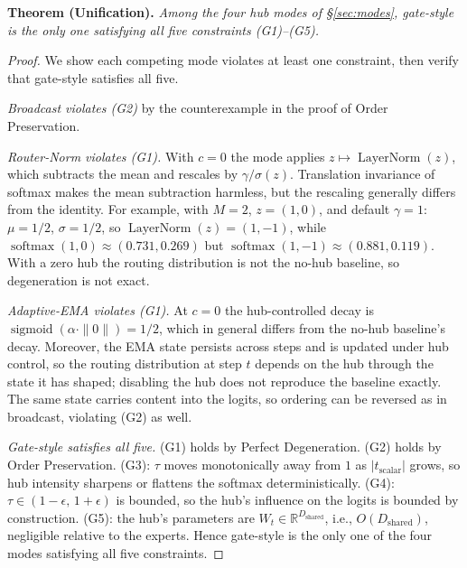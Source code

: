 \documentclass[10pt,twoside]{article}
\newcommand{\softmax}{\operatorname{softmax}}
\newcommand{\sigmoid}{\operatorname{sigmoid}}
\theoremstyle{definition}
\begin{document}
\medskip
\noindent\textbf{Theorem (Unification).} \emph{Among the four hub modes of \S\ref{sec:modes}, gate-style is the only one satisfying all five constraints (G1)--(G5).}

\begin{proof}
We show each competing mode violates at least one constraint, then verify that gate-style satisfies all five.

\emph{Broadcast violates (G2)} by the counterexample in the proof of Order Preservation.

\emph{Router-Norm violates (G1).} With $c = 0$ the mode applies $z \mapsto \operatorname{LayerNorm}(z)$, which subtracts the mean and rescales by $\gamma / \sigma(z)$. Translation invariance of softmax makes the mean subtraction harmless, but the rescaling generally differs from the identity. For example, with $M = 2$, $z = (1, 0)$, and default $\gamma = 1$: $\mu = 1/2$, $\sigma = 1/2$, so $\operatorname{LayerNorm}(z) = (1, -1)$, while $\softmax(1, 0) \approx (0.731, 0.269)$ but $\softmax(1, -1) \approx (0.881, 0.119)$. With a zero hub the routing distribution is not the no-hub baseline, so degeneration is not exact.

\emph{Adaptive-EMA violates (G1).} At $c = 0$ the hub-controlled decay is $\sigmoid(\alpha \cdot \|0\|) = 1/2$, which in general differs from the no-hub baseline's decay. Moreover, the EMA state persists across steps and is updated under hub control, so the routing distribution at step $t$ depends on the hub through the state it has shaped; disabling the hub does not reproduce the baseline exactly. The same state carries content into the logits, so ordering can be reversed as in broadcast, violating (G2) as well.

\emph{Gate-style satisfies all five.} (G1) holds by Perfect Degeneration. (G2) holds by Order Preservation. (G3): $\tau$ moves monotonically away from $1$ as $|t_{\text{scalar}}|$ grows, so hub intensity sharpens or flattens the softmax deterministically. (G4): $\tau \in (1 - \epsilon,\, 1 + \epsilon)$ is bounded, so the hub's influence on the logits is bounded by construction. (G5): the hub's parameters are $W_t \in \mathbb{R}^{D_{\text{shared}}}$, i.e., $O(D_{\text{shared}})$, negligible relative to the experts. Hence gate-style is the only one of the four modes satisfying all five constraints.
\end{proof}

\newpage

\end{document}
